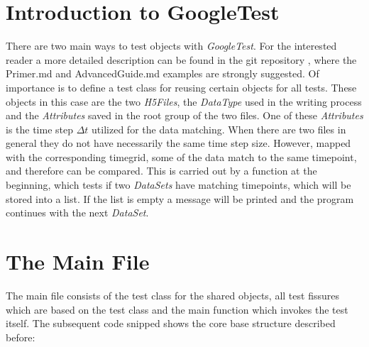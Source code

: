 \section{Introduction to GoogleTest}
There are two main ways to test objects with \textit{GoogleTest}. For the interested reader a more detailed description can be found in the git repository \cite{googletestdoc}, where the Primer.md and AdvancedGuide.md examples are strongly suggested. Of importance is to define a test class for reusing certain objects for all tests. These objects in this case are the two \textit{H5Files}, the \textit{DataType} used in the writing process and the \textit{Attributes} saved in the root group of the two files. One of these \textit{Attributes} is the time step $\Delta t$ utilized for the data matching. When there are two files in general they do not have necessarily the same time step size. However, mapped with the corresponding timegrid, some of the data match to the same timepoint, and therefore can be compared. This is carried out by a function at the beginning, which tests if two \textit{DataSets} have matching timepoints, which will be stored into a list. If the list is empty a message will be printed and the program continues with the next \textit{DataSet}.

\section{The Main File}
\label{seq:testmain}
The main file consists of the test class for the shared objects, all test fissures which are based on the test class and the main function which invokes the test itself. The subsequent code snipped shows the core base structure described before:

